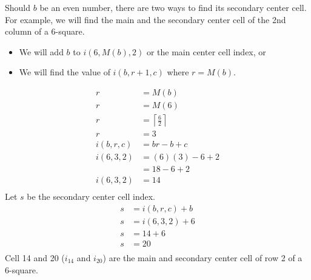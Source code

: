 \documentclass[letterpaper, twoside,12pt]{article}
\begin{document}
    \newpage

    Should $b$ be an even number, there are two ways to find its secondary center cell. For example, we will find the main and the secondary center cell of the 2nd column of a 6-square.
    \begin{itemize}
        \item We will add $b$ to $i(6,M(b),2)$ or the main center cell index, or
        \item We will find the value of $i(b,r+1,c)$ where $r=M(b)$.
    \end{itemize}
    \begin{equation}
        \begin{split}
            r &= M(b) \\
            r &= M(6) \\
            r &= \left\lceil \frac{6}{2} \right\rceil \\
            r &= 3 \\
            i(b,r,c) &= br - b + c \\
            i(6,3,2) &= (6)(3) - 6 + 2 \\
                &= 18 - 6 + 2 \\
            i(6,3,2) &= 14 \\
        \end{split}
    \end{equation}
    Let $s$ be the secondary center cell index.
    \begin{equation}
        \begin{split}
            s &= i(b,r,c) + b\\
            s &= i(6,3,2) + 6\\
            s &= 14 + 6\\
            s &= 20\\
        \end{split}
    \end{equation}
    Cell 14 and 20 ($i_{14}$ and $i_{20}$) are the main and secondary center cell of row 2 of a 6-square.
\end{document}

